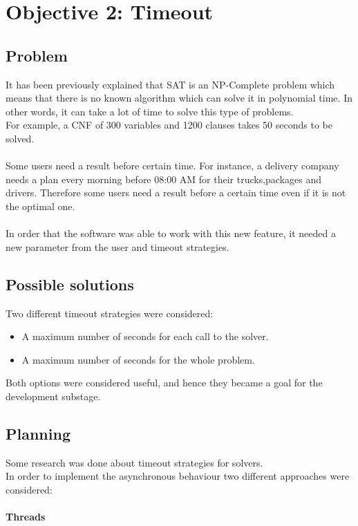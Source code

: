 \section{Objective 2: Timeout}

\subsection{Problem}
It has been previously explained that SAT is an NP-Complete problem which means that there is no known algorithm which can solve it in polynomial time. In other words, it can take a lot of time to solve this type of problems. \\
For example, a CNF of 300 variables and 1200 clauses takes 50 seconds to be solved.  \\\\
Some users need a result before certain time. For instance, a delivery company needs a plan every morning before 08:00 AM for their trucks,packages and drivers. Therefore some users need a result before a certain time even if it is not the optimal one.  \\\\
In order that the software was able to work with this new feature, it needed a new parameter from the user and timeout strategies.

\subsection{Possible solutions}
Two different timeout strategies were considered:  

\begin{itemize}
	\item A maximum number of seconds for each call to the solver.
	\item A maximum number of seconds for the whole problem. 
\end{itemize}
Both options were considered useful, and hence they became a goal for the development substage.   

\subsection{Planning}
Some research was done about timeout strategies for solvers.  \\
In order to implement the asynchronous behaviour two different approaches were considered:  

\paragraph{Threads}

